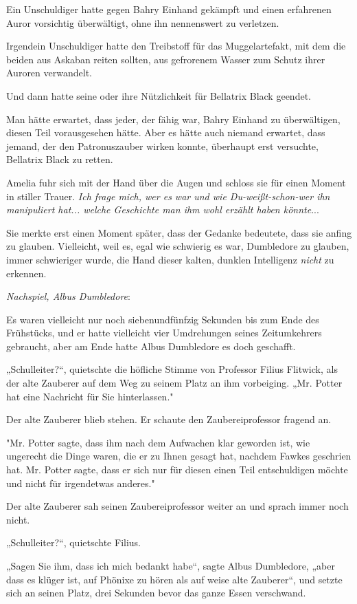 {Ein Unschuldiger hatte gegen Bahry Einhand gekämpft und einen erfahrenen Auror vorsichtig überwältigt, ohne ihn nennenswert zu verletzen.

Irgendein Unschuldiger hatte den Treibstoff für das Muggelartefakt, mit dem die beiden aus Askaban reiten sollten, aus gefrorenem Wasser zum Schutz ihrer Auroren verwandelt.

Und dann hatte seine oder ihre Nützlichkeit für Bellatrix Black geendet.

Man hätte erwartet, dass jeder, der fähig war, Bahry Einhand zu überwältigen, diesen Teil vorausgesehen hätte. Aber es hätte auch niemand erwartet, dass jemand, der den Patronuszauber wirken konnte, überhaupt erst versuchte, Bellatrix Black zu retten.

Amelia fuhr sich mit der Hand über die Augen und schloss sie für einen Moment in stiller Trauer. \emph{Ich frage mich, wer es war und wie Du-weißt-schon-wer ihn manipuliert hat... welche Geschichte man ihm wohl erzählt haben könnte}...

Sie merkte erst einen Moment später, dass der Gedanke bedeutete, dass sie anfing zu glauben. Vielleicht, weil es, egal wie schwierig es war, Dumbledore zu glauben, immer schwieriger wurde, die Hand dieser kalten, dunklen Intelligenz \emph{nicht} zu erkennen.

\emph{Nachspiel, Albus Dumbledore}:

Es waren vielleicht nur noch siebenundfünfzig Sekunden bis zum Ende des Frühstücks, und er hatte vielleicht vier Umdrehungen seines Zeitumkehrers gebraucht, aber am Ende hatte Albus Dumbledore es doch geschafft.

„Schulleiter?“, quietschte die höfliche Stimme von Professor Filius Flitwick, als der alte Zauberer auf dem Weg zu seinem Platz an ihm vorbeiging. „Mr. Potter hat eine Nachricht für Sie hinterlassen."

Der alte Zauberer blieb stehen. Er schaute den Zaubereiprofessor fragend an.

"Mr. Potter sagte, dass ihm nach dem Aufwachen klar geworden ist, wie ungerecht die Dinge waren, die er zu Ihnen gesagt hat, nachdem Fawkes geschrien hat. Mr. Potter sagte, dass er sich nur für diesen einen Teil entschuldigen möchte und nicht für irgendetwas anderes."

Der alte Zauberer sah seinen Zaubereiprofessor weiter an und sprach immer noch nicht.

„Schulleiter?“, quietschte Filius.

„Sagen Sie ihm, dass ich mich bedankt habe“, sagte Albus Dumbledore, „aber dass es klüger ist, auf Phönixe zu hören als auf weise alte Zauberer“, und setzte sich an seinen Platz, drei Sekunden bevor das ganze Essen verschwand.

}
